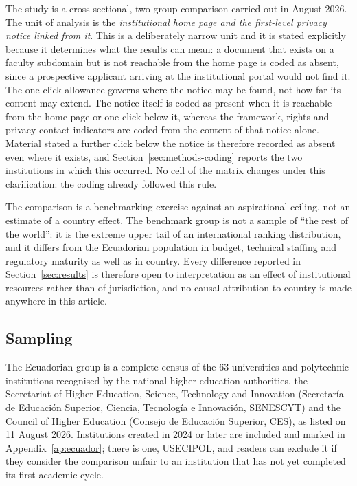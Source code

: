 \documentclass[pdflatex,sn-basic,Numbered,iicol]{sn-jnl}
\theoremstyle{thmstyleone}
\theoremstyle{thmstyletwo}
\theoremstyle{thmstylethree}
\begin{document}
The study is a cross-sectional, two-group comparison carried out in August 2026. The unit of analysis is the \emph{institutional home page and the first-level privacy notice linked from it}. This is a deliberately narrow unit and it is stated explicitly because it determines what the results can mean: a document that exists on a faculty subdomain but is not reachable from the home page is coded as absent, since a prospective applicant arriving at the institutional portal would not find it. The one-click allowance governs where the notice may be found, not how far its content may extend. The notice itself is coded as present when it is reachable from the home page or one click below it, whereas the framework, rights and privacy-contact indicators are coded from the content of that notice alone. Material stated a further click below the notice is therefore recorded as absent even where it exists, and Section~\ref{sec:methods-coding} reports the two institutions in which this occurred. No cell of the matrix changes under this clarification: the coding already followed this rule.

The comparison is a benchmarking exercise against an aspirational ceiling, not an estimate of a country effect. The benchmark group is not a sample of ``the rest of the world'': it is the extreme upper tail of an international ranking distribution, and it differs from the Ecuadorian population in budget, technical staffing and regulatory maturity as well as in country. Every difference reported in Section~\ref{sec:results} is therefore open to interpretation as an effect of institutional resources rather than of jurisdiction, and no causal attribution to country is made anywhere in this article.

\subsection{Sampling}\label{sec:methods-sampling}

The Ecuadorian group is a complete census of the 63 universities and polytechnic institutions recognised by the national higher-education authorities, the Secretariat of Higher Education, Science, Technology and Innovation (Secretar\'ia de Educaci\'on Superior, Ciencia, Tecnolog\'ia e Innovaci\'on, SENESCYT) and the Council of Higher Education (Consejo de Educaci\'on Superior, CES), as listed on 11 August 2026. Institutions created in 2024 or later are included and marked in Appendix~\ref{ap:ecuador}; there is one, USECIPOL, and readers can exclude it if they consider the comparison unfair to an institution that has not yet completed its first academic cycle.
\end{document}
